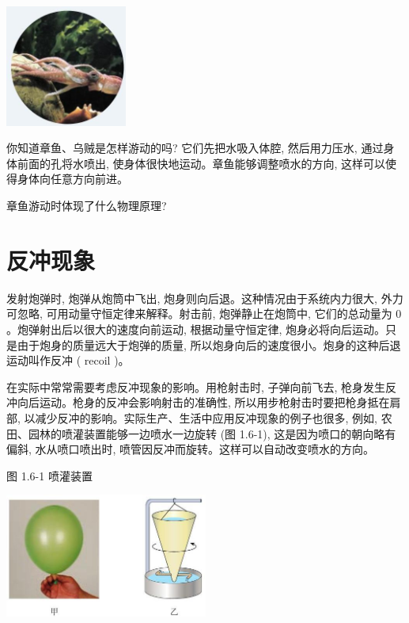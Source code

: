 \documentclass[10pt]{article}
\begin{document}
\begin{center}
\includegraphics[max width=0.3\textwidth]{images/01910e4c-ebb8-7d2c-8f2f-2375bc1d2d12_30_552427.jpg}
\end{center}

你知道章鱼、乌贼是怎样游动的吗? 它们先把水吸入体腔, 然后用力压水, 通过身体前面的孔将水喷出, 使身体很快地运动。章鱼能够调整喷水的方向, 这样可以使得身体向任意方向前进。

章鱼游动时体现了什么物理原理?

\section*{反冲现象}

发射炮弹时, 炮弹从炮筒中飞出, 炮身则向后退。这种情况由于系统内力很大, 外力可忽略, 可用动量守恒定律来解释。射击前, 炮弹静止在炮筒中, 它们的总动量为 0 。炮弹射出后以很大的速度向前运动, 根据动量守恒定律, 炮身必将向后运动。只是由于炮身的质量远大于炮弹的质量, 所以炮身向后的速度很小。炮身的这种后退运动叫作反冲 ( recoil )。

在实际中常常需要考虑反冲现象的影响。用枪射击时, 子弹向前飞去, 枪身发生反冲向后运动。枪身的反冲会影响射击的准确性, 所以用步枪射击时要把枪身抵在肩部, 以减少反冲的影响。实际生产、生活中应用反冲现象的例子也很多, 例如, 农田、园林的喷灌装置能够一边喷水一边旋转 (图 1.6-1), 这是因为喷口的朝向略有偏斜, 水从喷口喷出时, 喷管因反冲而旋转。这样可以自动改变喷水的方向。

\begin{mdframed}

图 1.6-1 喷灌装置

\end{mdframed}

\begin{center}
\includegraphics[max width=0.5\textwidth]{images/01910e4c-ebb8-7d2c-8f2f-2375bc1d2d12_31_552231.jpg}
\end{center}
\end{document}
